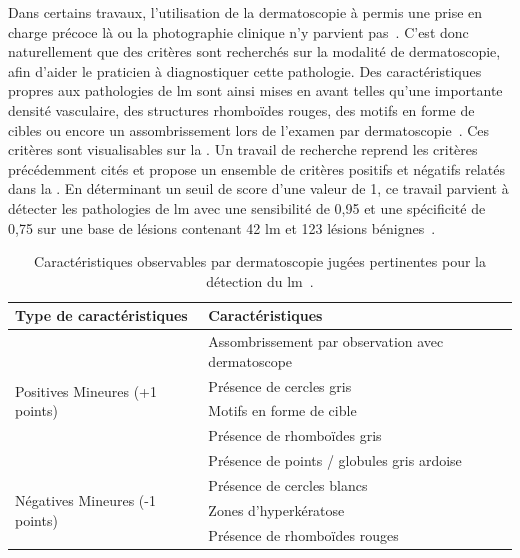 Dans certains travaux, l'utilisation de la dermatoscopie à permis une prise en charge précoce là ou la photographie clinique n'y parvient pas~\cite{Stante2005}. C'est donc naturellement que des critères sont recherchés sur la modalité de dermatoscopie, afin d'aider le praticien à diagnostiquer cette pathologie. Des caractéristiques propres aux pathologies de \gls{lm} sont ainsi mises en avant telles qu'une importante densité vasculaire, des structures rhomboïdes rouges, des motifs en forme de cibles ou encore un assombrissement lors de l'examen par dermatoscopie~\cite{Pralong2012}. Ces critères sont visualisables sur la . Un travail de recherche reprend les critères précédemment cités et propose un ensemble de critères positifs et négatifs relatés dans la . En déterminant un seuil de score d'une valeur de 1, ce travail parvient à détecter les pathologies de \gls{lm} avec une sensibilité de 0,95 et une spécificité de 0,75 sur une base de lésions contenant 42 \gls{lm} et 123 lésions bénignes~\cite{Ozbagcivan2019}.\par

\begin{table}[H]
    \centering
    \begin{tabular}{ll}
        \toprule
        Type de caractéristiques                        & Caractéristiques                                              \\\hline
        \multirow{5}{*}{Positives Mineures (+1 points)} & Assombrissement par observation avec dermatoscope             \\\cline{2-2}
                                                        & Présence de cercles gris                                      \\\cline{2-2}
                                                        & Motifs en forme de cible                                      \\\cline{2-2}
                                                        & Présence de rhomboïdes gris                                   \\\cline{2-2}
                                                        & Présence de points / globules gris ardoise                    \\\midrule
        \multirow{3}{*}{Négatives Mineures (-1 points)} & Présence de cercles blancs                                    \\\cline{2-2}
                                                        & Zones d'hyperkératose                                         \\\cline{2-2}
                                                        & Présence de rhomboïdes rouges                                 \\\bottomrule
    \end{tabular}
    \caption{Caractéristiques observables par dermatoscopie jugées pertinentes pour la détection du \gls{lm}~\cite{Ozbagcivan2019}.}
    \label{tab:dermoscopy_algorithm_lentigo}
\end{table}\par

